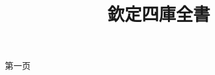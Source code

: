 \documentclass[debug=true]{ltc-guji}
\title{欽定四庫全書}
\begin{document}
\begin{正文}
第一页

\end{正文}
\end{document}
